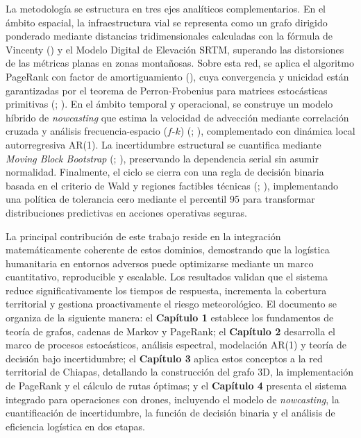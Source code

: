 \documentclass[
  spanish,
  us-letterpaper,
]{scrreprt}
\numberwithin{equation}{section}
\begin{document}
La metodología se estructura en tres ejes analíticos complementarios. En
el ámbito espacial, la infraestructura vial se representa como un grafo
dirigido ponderado mediante distancias tridimensionales calculadas con
la fórmula de Vincenty () y el
Modelo Digital de Elevación SRTM, superando las distorsiones de las
métricas planas en zonas montañosas. Sobre esta red, se aplica el
algoritmo PageRank con factor de amortiguamiento
(), cuya convergencia y
unicidad están garantizadas por el teorema de Perron-Frobenius para
matrices estocásticas primitivas (; ). En
el ámbito temporal y operacional, se construye un modelo híbrido de
\emph{nowcasting} que estima la velocidad de advección mediante
correlación cruzada y análisis frecuencia-espacio (\(f\)-\(k\))
(;
), complementado con
dinámica local autorregresiva AR(1). La incertidumbre estructural se
cuantifica mediante \emph{Moving Block Bootstrap}
(;
), preservando la
dependencia serial sin asumir normalidad. Finalmente, el ciclo se cierra
con una regla de decisión binaria basada en el criterio de Wald y
regiones factibles técnicas (; ), implementando una
política de tolerancia cero mediante el percentil 95 para transformar
distribuciones predictivas en acciones operativas seguras.

La principal contribución de este trabajo reside en la integración
matemáticamente coherente de estos dominios, demostrando que la
logística humanitaria en entornos adversos puede optimizarse mediante un
marco cuantitativo, reproducible y escalable. Los resultados validan que
el sistema reduce significativamente los tiempos de respuesta,
incrementa la cobertura territorial y gestiona proactivamente el riesgo
meteorológico. El documento se organiza de la siguiente manera: el
\textbf{Capítulo 1} establece los fundamentos de teoría de grafos,
cadenas de Markov y PageRank; el \textbf{Capítulo 2} desarrolla el marco
de procesos estocásticos, análisis espectral, modelación AR(1) y teoría
de decisión bajo incertidumbre; el \textbf{Capítulo 3} aplica estos
conceptos a la red territorial de Chiapas, detallando la construcción
del grafo 3D, la implementación de PageRank y el cálculo de rutas
óptimas; y el \textbf{Capítulo 4} presenta el sistema integrado para
operaciones con drones, incluyendo el modelo de \emph{nowcasting}, la
cuantificación de incertidumbre, la función de decisión binaria y el
análisis de eficiencia logística en dos etapas.
\end{document}
